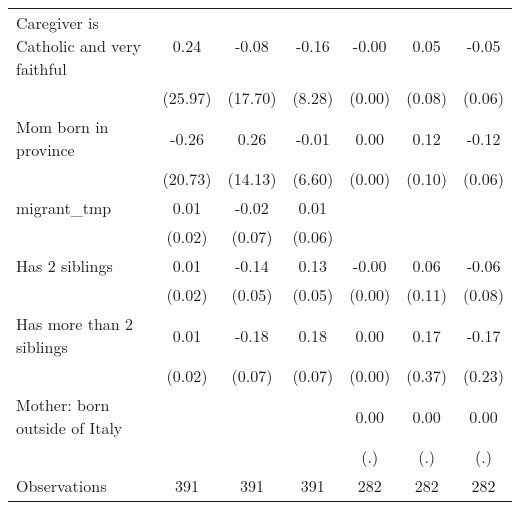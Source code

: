 {\begin{tabular}{l*{6}{c}}
\addlinespace
Caregiver is Catholic and very faithful&        0.24         &       -0.08         &       -0.16         &       -0.00         &        0.05         &       -0.05         \\
                    &     (25.97)         &     (17.70)         &      (8.28)         &      (0.00)         &      (0.08)         &      (0.06)         \\
\addlinespace
Mom born in province&       -0.26         &        0.26         &       -0.01         &        0.00         &        0.12         &       -0.12         \\
                    &     (20.73)         &     (14.13)         &      (6.60)         &      (0.00)         &      (0.10)         &      (0.06)         \\
\addlinespace
migrant\_tmp         &        0.01         &       -0.02         &        0.01         &                     &                     &                     \\
                    &      (0.02)         &      (0.07)         &      (0.06)         &                     &                     &                     \\
\addlinespace
Has 2 siblings      &        0.01         &       -0.14\sym{**} &        0.13\sym{*}  &       -0.00         &        0.06         &       -0.06         \\
                    &      (0.02)         &      (0.05)         &      (0.05)         &      (0.00)         &      (0.11)         &      (0.08)         \\
\addlinespace
Has more than 2 siblings&        0.01         &       -0.18\sym{*}  &        0.18\sym{*}  &        0.00         &        0.17         &       -0.17         \\
                    &      (0.02)         &      (0.07)         &      (0.07)         &      (0.00)         &      (0.37)         &      (0.23)         \\
\addlinespace
Mother: born outside of Italy&                     &                     &                     &        0.00         &        0.00         &        0.00         \\
                    &                     &                     &                     &         (.)         &         (.)         &         (.)         \\
\midrule
Observations        &         391         &         391         &         391         &         282         &         282         &         282         \\
\bottomrule
\end{tabular}
}
